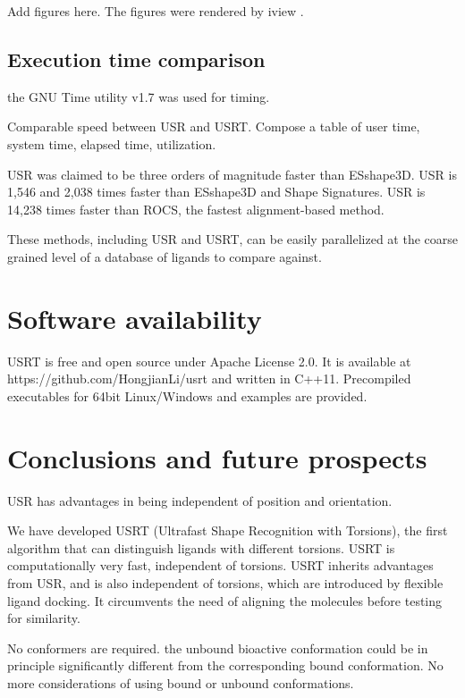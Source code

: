 \documentclass[twocolumn]{svjour3}          %
\begin{document}
Add figures here. The figures were rendered by iview \cite{1366}.

\subsection{Execution time comparison}

the GNU Time utility v1.7 was used for timing.

Comparable speed between USR and USRT. Compose a table of user time, system time, elapsed time, utilization.

USR was claimed to be three orders of magnitude faster than ESshape3D. USR is 1,546 and 2,038 times faster than ESshape3D and Shape Signatures. USR is 14,238 times faster than ROCS, the fastest alignment-based method.

These methods, including USR and USRT, can be easily parallelized at the coarse grained level of a database of ligands to compare against.

\section{Software availability}

USRT is free and open source under Apache License 2.0. It is available at https://github.com/HongjianLi/usrt and written in C++11. Precompiled executables for 64bit Linux/Windows and examples are provided.

\section{Conclusions and future prospects}

USR has advantages in being independent of position and orientation.

We have developed USRT (Ultrafast Shape Recognition with Torsions), the first algorithm that can distinguish ligands with different torsions. USRT is computationally very fast, independent of torsions. USRT inherits advantages from USR, and is also independent of torsions, which are introduced by flexible ligand docking. It circumvents the need of aligning the molecules before testing for similarity.

No conformers are required. the unbound bioactive conformation could be in principle significantly different from the corresponding bound conformation. No more considerations of using bound or unbound conformations.
\end{document}

